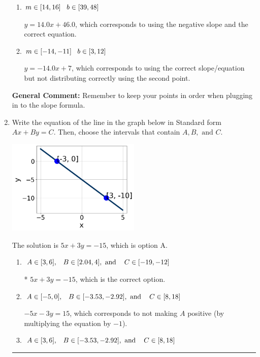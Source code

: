 \documentclass{extbook}[14pt]
\newcommand{\litem}[1]{\item #1

\rule{\textwidth}{0.4pt}}
\begin{document}
\begin{enumerate}
{\begin{enumerate}[label=\Alph*.]
 $y = -14.0x -8$, which corresponds to using the correct slope/equation but not distributing correctly using the first point.
\item \( m \in [14, 16] \hspace*{3mm} b \in [39, 48] \)

 $y = 14.0x + 46.0$, which corresponds to using the negative slope and the correct equation.
\item \( m \in [-14, -11] \hspace*{3mm} b \in [3, 12] \)

 $y = -14.0x + 7$, which corresponds to using the correct slope/equation but not distributing correctly using the second point.
\end{enumerate}

\textbf{General Comment:} Remember to keep your points in order when plugging in to the slope formula.
}
\litem{
Write the equation of the line in the graph below in Standard form $Ax+By=C$. Then, choose the intervals that contain $A, B, \text{ and } C$.

\begin{center}
    \includegraphics[width=0.5\textwidth]{../Figures/linearGraphToStandardCopyA.png}
\end{center}




The solution is \( 5x + 3y = -15 \), which is option A.\begin{enumerate}[label=\Alph*.]
\item \( A \in [3, 6], \hspace{3mm} B \in [2.04, 4], \text{ and } \hspace{3mm} C \in [-19, -12] \)

* $5x + 3y = -15$, which is the correct option.
\item \( A \in [-5, 0], \hspace{3mm} B \in [-3.53, -2.92], \text{ and } \hspace{3mm} C \in [8, 18] \)

 $-5x - 3y = 15$, which corresponds to not making $A$ positive (by multiplying the equation by $-1$).
\item \( A \in [3, 6], \hspace{3mm} B \in [-3.53, -2.92], \text{ and } \hspace{3mm} C \in [8, 18] \)


\end{enumerate}}
\end{enumerate}
\end{document}
